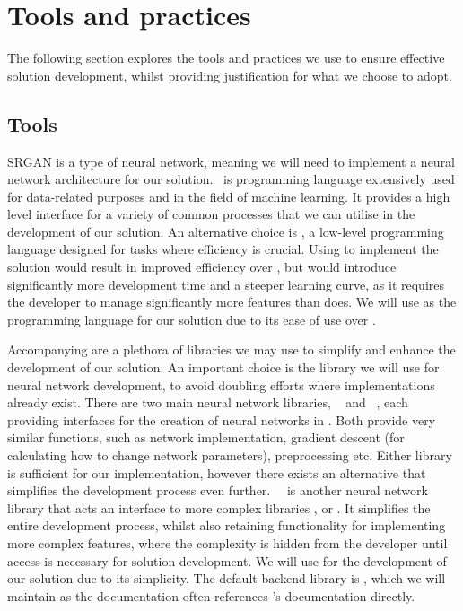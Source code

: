 \section{Tools and practices}\label{sec:tools_and_practices}
The following section explores the tools and practices we use to ensure effective solution development, whilst providing justification for what we choose to adopt.

\subsection{Tools}
SRGAN is a type of neural network, meaning we will need to implement a neural network architecture for our solution.\  is programming language extensively used for data-related purposes and in the field of machine learning. It provides a high level interface for a variety of common processes that we can utilise in the development of our solution. An alternative choice is , a low-level programming language designed for tasks where efficiency is crucial. Using  to implement the solution would result in improved efficiency over , but would introduce significantly more development time and a steeper learning curve, as it requires the developer to manage significantly more features than  does. We will use  as the programming language for our solution due to its ease of use over .

Accompanying  are a plethora of libraries we may use to simplify and enhance the development of our solution. An important choice is the library we will use for neural network development, to avoid doubling efforts where implementations already exist. There are two main neural network libraries, ~\cite{tensorflow} and ~\cite{pytorch}, each providing interfaces for the creation of neural networks in . Both provide very similar functions, such as network implementation, gradient descent (for calculating how to change network parameters), preprocessing etc. Either library is sufficient for our implementation, however there exists an alternative that simplifies the development process even further.\ ~\cite{keras} is another neural network library that acts an interface to more complex libraries ,  or . It simplifies the entire development process, whilst also retaining functionality for implementing more complex features, where the complexity is hidden from the developer until access is necessary for solution development. We will use  for the development of our solution due to its simplicity. The default backend library is , which we will maintain as the  documentation often references 's documentation directly.

